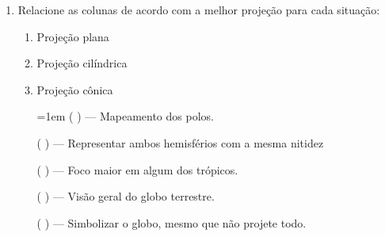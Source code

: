 \begin{enumerate}
\item Relacione as colunas de acordo com a melhor projeção para cada situação:

\begin{multicols}{2}
\begin{enumerate}
\item Projeção plana
\item Projeção cilíndrica
\item Projeção cônica

\columnbreak

\parskip=1em
({ }{ }{ }) --- Mapeamento dos polos.

({ }{ }) --- Representar ambos hemisférios com a mesma nitidez

({ }{ }{ }) --- Foco maior em algum dos trópicos.

({ }{ }{ }) --- Visão geral do globo terrestre.

({ }{ }{ }) --- Simbolizar o globo, mesmo que não projete todo.
\end{enumerate}

\end{multicols}

\end{enumerate}







